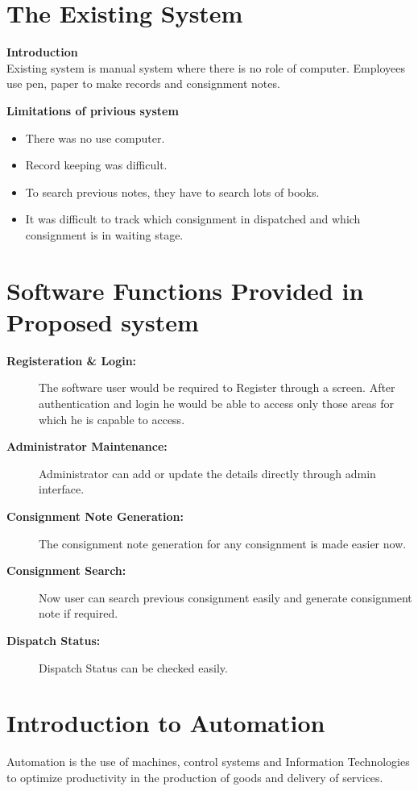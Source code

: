 \section{The Existing System}
{\bf Introduction }\\
Existing system is manual system where there is no role of computer. 
Employees use pen, paper to make records and consignment notes.

{\bf {Limitations of privious system }}
\begin{itemize}
\item There was no use computer.

\item Record keeping was difficult.

\item To search previous notes, they have to search lots of books.

\item It was difficult to track which consignment in dispatched and
which consignment is in waiting stage.

\end{itemize}

\section{Software Functions Provided in Proposed system}

\begin{description}
\item[\bf{Registeration \& Login}:]
The software user would be required to Register through a screen. After 
authentication and login he would be able to access only those areas 
for which he is capable to access.
\item[\bf{Administrator Maintenance}:]
Administrator can add or update the details directly through admin 
interface.
\item[\bf{Consignment Note Generation}:]
The consignment note generation for any consignment is made easier now.
\item[\bf{Consignment Search}:]
Now user can search previous consignment easily and generate consignment 
note if required.
\item[\bf{Dispatch Status}:]
Dispatch Status can be checked easily. 
\end{description}

\section{Introduction to Automation}
Automation is the use of machines, control systems and Information 
Technologies to optimize productivity in the production of goods and 
delivery of services. 

